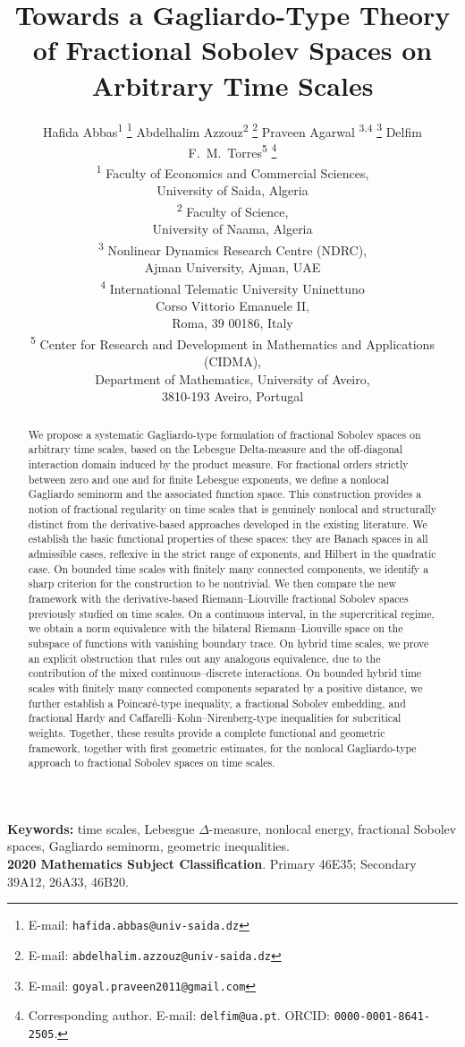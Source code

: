 \documentclass[11pt,a4paper]{article}
\title{\textbf{Towards a Gagliardo-Type Theory of Fractional Sobolev Spaces on Arbitrary Time Scales}}
\author{
    Hafida Abbas\textsuperscript{1} \thanks{E-mail: \texttt{hafida.abbas@univ-saida.dz}} \quad
    Abdelhalim Azzouz\textsuperscript{2} \thanks{E-mail: \texttt{abdelhalim.azzouz@univ-saida.dz}} \quad
    Praveen Agarwal \textsuperscript{3,4} \thanks{E-mail: \texttt{goyal.praveen2011@gmail.com}} \quad
    Delfim F.~M.~Torres\textsuperscript{5} \thanks{Corresponding author. E-mail: \texttt{delfim@ua.pt}. ORCID: \texttt{0000-0001-8641-2505}.}  \\[0.2cm]
    \normalsize\textsuperscript{1} Faculty of Economics and Commercial Sciences,\\ University of Saida, Algeria\\
    \normalsize\textsuperscript{2} Faculty of Science,\\ University of Naama, Algeria\\
    \normalsize\textsuperscript{3} Nonlinear Dynamics Research Centre (NDRC), \\Ajman University, Ajman, UAE\\
\normalsize\textsuperscript{4} International Telematic University Uninettuno\\ Corso Vittorio Emanuele II,\\ Roma, 39 00186, Italy\\
\normalsize\textsuperscript{5} Center for Research and Development in Mathematics and Applications (CIDMA),\\ Department of Mathematics, University of Aveiro,\\ 3810-193 Aveiro, Portugal
}
\date{}
\numberwithin{equation}{section}
\theoremstyle{definition}
\begin{document}
\maketitle

\begin{abstract}
We propose a systematic Gagliardo-type formulation of fractional Sobolev spaces on arbitrary time scales, based on the Lebesgue Delta-measure and the off-diagonal interaction domain induced by the product measure. For fractional orders strictly between zero and one and for finite Lebesgue exponents, we define a nonlocal Gagliardo seminorm and the associated function space. This construction provides a notion of fractional regularity on time scales that is genuinely nonlocal and structurally distinct from the derivative-based approaches developed in the existing literature.
We establish the basic functional properties of these spaces: they are Banach spaces in all admissible cases, reflexive in the strict range of exponents, and Hilbert in the quadratic case. On bounded time scales with finitely many connected components, we identify a sharp criterion for the construction to be nontrivial. We then compare the new framework with the derivative-based Riemann--Liouville fractional Sobolev spaces previously studied on time scales. On a continuous interval, in the supercritical regime, we obtain a norm equivalence with the bilateral Riemann--Liouville space on the subspace of functions with vanishing boundary trace. On hybrid time scales, we prove an explicit obstruction that rules out any analogous equivalence, due to the contribution of the mixed continuous--discrete interactions.
On bounded hybrid time scales with finitely many connected components separated by a positive distance, we further establish a Poincar\'e-type inequality, a fractional Sobolev embedding, and fractional Hardy and Caffarelli--Kohn--Nirenberg-type inequalities for subcritical weights. Together, these results provide a complete functional and geometric framework, together with first geometric estimates, for the nonlocal Gagliardo-type approach to fractional Sobolev spaces on time scales.
\end{abstract}

\noindent\textbf{Keywords:}
time scales, Lebesgue $\Delta$-measure, nonlocal energy, fractional Sobolev spaces, Gagliardo seminorm, geometric inequalities.\\
\noindent\textbf{2020 Mathematics Subject Classification}. Primary 46E35; Secondary 39A12, 26A33, 46B20.

\end{document}
